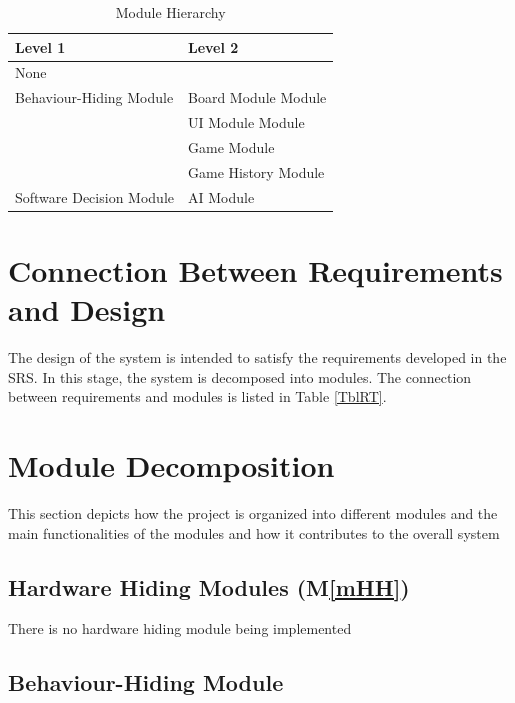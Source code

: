 \documentclass[12pt, titlepage]{article}
\newcommand{\mref}[1]{M\ref{#1}}
\begin{document}
{\begin{table}[h!]
\centering
\begin{tabular}{p{} p{}}
\toprule
\textbf{Level 1} & \textbf{Level 2}\\
\midrule

{None} & ~ \\
\midrule

\multirow{1}{0.3\textwidth}{Behaviour-Hiding Module} 
& {\color{blue}Board Module } Module\\
& {\color{blue}UI Module } Module\\
& Game Module\\
& Game History Module\\
\midrule

\multirow{1}{0.3\textwidth}{Software Decision Module} 
& AI Module\\
\bottomrule

\end{tabular}
\caption{Module Hierarchy}
\label{TblMH}
\end{table}

\section{Connection Between Requirements and Design} \label{SecConnection}

The design of the system is intended to satisfy the requirements developed in
the SRS. In this stage, the system is decomposed into modules. The connection
between requirements and modules is listed in Table \ref{TblRT}.

\section{Module Decomposition} \label{SecMD}

{\color{blue}
This section depicts how the project is organized into different modules and the main functionalities of the modules and how it contributes to the overall system}

\subsection{Hardware Hiding Modules (\mref{mHH})}

{\color{blue}
There is no hardware hiding module being implemented}


\subsection{Behaviour-Hiding Module}

}
\end{document}
